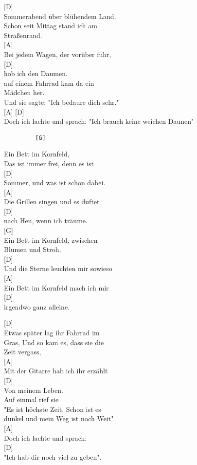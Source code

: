 \documentclass[
  letterpaper,
]{scrbook}
\begin{document}
{[}D{]}\\
Sommerabend über blühendem Land.\\
Schon seit Mittag stand ich am\\
Straßenrand.\\
{[}A{]}\\
Bei jedem Wagen, der vorüber fuhr,\\
{[}D{]}\\
hob ich den Daumen.\\
auf einem Fahrrad kam da ein\\
Mädchen her.\\
Und sie sagte: "Ich bedaure dich sehr."\\
{[}A{]} {[}D{]}\\
Doch ich lachte und sprach: "Ich brauch keine weichen Daunen"

\begin{verbatim}
         [G]
\end{verbatim}

Ein Bett im Kornfeld,\\
Das ist immer frei, denn es ist\\
{[}D{]}\\
Sommer, und was ist schon dabei.\\
{[}A{]}\\
Die Grillen singen und es duftet\\
{[}D{]}\\
nach Heu, wenn ich träume.\\
{[}G{]}\\
Ein Bett im Kornfeld, zwischen\\
Blumen und Stroh,\\
{[}D{]}\\
Und die Sterne leuchten mir sowieso\\
{[}A{]}\\
Ein Bett im Kornfeld mach ich mir\\
{[}D{]}\\
irgendwo ganz alleine.

{[}D{]}\\
Etwas später lag ihr Fahrrad im\\
Gras, Und so kam es, dass sie die\\
Zeit vergass,\\
{[}A{]}\\
Mit der Gitarre hab ich ihr erzählt\\
{[}D{]}\\
Von meinem Leben.\\
Auf einmal rief sie\\
"Es ist höchste Zeit, Schon ist es\\
dunkel und mein Weg ist noch Weit"\\
{[}A{]}\\
Doch ich lachte und sprach:\\
{[}D{]}\\
"Ich hab dir noch viel zu geben".
\end{document}
